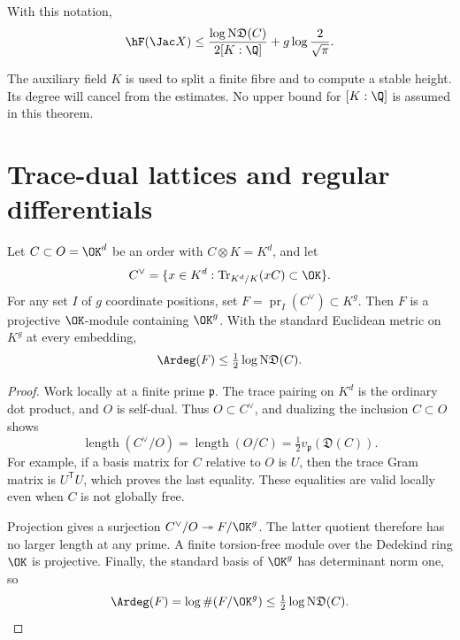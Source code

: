 \begin{theorem}\label{thm:evaluation}
With this notation,
\begin{equation}\label{eq:evaluation-bound}
 \hF(\Jac X)
 \le\frac{\log\mathrm N\mathfrak D(C)}{2[K:\Q]}
       +g\log\frac2{\sqrt\pi}.
\end{equation}
\end{theorem}

The auxiliary field $K$ is used to split a finite fibre and to
compute a stable height. Its degree will cancel from the estimates.
No upper bound for $[K:\Q]$ is assumed in this theorem.

\section{Trace-dual lattices and regular differentials}

\begin{lemma}\label{lem:trace-lattice}
Let $C\subset O=\OK^d$ be an order with $C\otimes K=K^d$, and
let
\[
 C^\vee=\{x\in K^d:\operatorname{Tr}_{K^d/K}(xC)\subset\OK\}.
\]
For any set $I$ of $g$ coordinate positions, set
$F=\operatorname{pr}_I(C^\vee)\subset K^g$.
Then $F$ is a projective $\OK$-module containing $\OK^g$.
With the standard Euclidean metric on $K^g$ at every embedding,
\[
 \Ardeg(F)\le\tfrac12\log\mathrm N\mathfrak D(C).
\]
\end{lemma}
\begin{proof}
Work locally at a finite prime $\mathfrak p$. The trace pairing
on $K^d$ is the ordinary dot product, and $O$ is self-dual.
Thus $O\subset C^\vee$, and dualizing the inclusion $C\subset O$
shows
\[
 \operatorname{length}(C^\vee/O)
 =\operatorname{length}(O/C)
 =\tfrac12v_{\mathfrak p}(\mathfrak D(C)).
\]
For example, if a basis matrix for $C$ relative to $O$ is $U$,
then the trace Gram matrix is $U^{\mathsf T}U$, which proves the
last equality. These equalities are valid locally even when
$C$ is not globally free.

Projection gives a surjection
$C^\vee/O\twoheadrightarrow F/\OK^g$. The latter quotient
therefore has no larger length at any prime.
A finite torsion-free module over the Dedekind ring $\OK$ is
projective. Finally, the standard basis of $\OK^g$ has determinant
norm one, so
\[
 \Ardeg(F)=\log\#(F/\OK^g)
 \le\tfrac12\log\mathrm N\mathfrak D(C).
\]
\end{proof}

